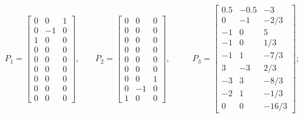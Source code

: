 \documentclass[11pt,reqno,oneside,a4paper]{article}
\theoremstyle{plain} %
\theoremstyle{definition}
\theoremstyle{remark}
\begin{document}
\begin{equation*}
\begin{aligned}
P_1 = \begin{bmatrix} 0 & 0 & 1 \\ 0 & -1 & 0 \\ 1 & 0 & 0 \\0 & 0 & 0 \\ 0 & 0 & 0 \\ 0 & 0 & 0 \\ 0 & 0 & 0 \\ 0 & 0 & 0 \\ 0 & 0 & 0 \end{bmatrix}, &\quad P_2 = \begin{bmatrix} 0 & 0 & 0 \\ 0 & 0 & 0 \\ 0 & 0 & 0 \\ 0 & 0 & 0 \\ 0 & 0 & 0 \\ 0 & 0 & 0 \\ 0 & 0 & 1 \\ 0 & -1 & 0 \\ 1 & 0 & 0 \end{bmatrix}, &&\quad P_3 = \begin{bmatrix} 0.5 & -0.5 & -3 \\ 0 & -1 & -2/3 \\ -1 & 0 & 5 \\ -1 & 0 & 1/3 \\ -1 & 1 & -7/3 \\ 3 & -3 & 2/3 \\ -3 & 3 & -8/3\\ -2 & 1 & -1/3 \\ 0 & 0 & -16/3 \end{bmatrix}; \\

\end{aligned}
\end{equation*}
\end{document}
